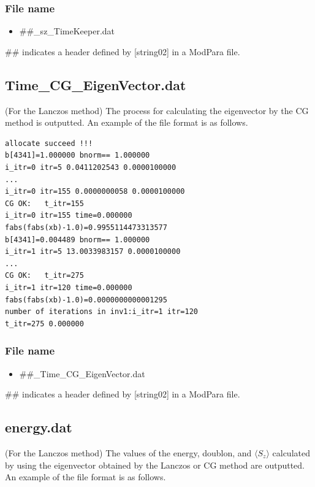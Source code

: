 \subsubsection{File name}
 \begin{itemize}
   \item  \#\#\_sz\_TimeKeeper.dat
 \end{itemize}
 \#\# indicates a header defined by [string02] in a ModPara file.
 
\newpage
\subsection{Time\_CG\_EigenVector.dat}
\label{Subsec:timecgeigenv}
(For the Lanczos method) The process for calculating the eigenvector by the CG method is outputted.
An example of the file format is as follows.

\begin{minipage}{12.5cm}
\begin{screen}
\begin{verbatim}
allocate succeed !!! 
b[4341]=1.000000 bnorm== 1.000000 
i_itr=0 itr=5 0.0411202543 0.0000100000 
...
i_itr=0 itr=155 0.0000000058 0.0000100000 
CG OK:   t_itr=155 
i_itr=0 itr=155 time=0.000000  
fabs(fabs(xb)-1.0)=0.9955114473313577
b[4341]=0.004489 bnorm== 1.000000 
i_itr=1 itr=5 13.0033983157 0.0000100000 
...
CG OK:   t_itr=275 
i_itr=1 itr=120 time=0.000000  
fabs(fabs(xb)-1.0)=0.0000000000001295
number of iterations in inv1:i_itr=1 itr=120 
t_itr=275 0.000000
\end{verbatim}
\end{screen}
\end{minipage}

\subsubsection{File name}
 \begin{itemize}
   \item  \#\#\_Time\_CG\_EigenVector.dat
 \end{itemize}
 \#\# indicates a header defined by [string02] in a ModPara file.

\newpage
\subsection{energy.dat}
\label{subsec:energy.dat}
(For the Lanczos method) The values of the energy, doublon, and $\langle S_z \rangle$ calculated by using the eigenvector obtained by the Lanczos or CG method are outputted.
An example of the file format is as follows.\\

